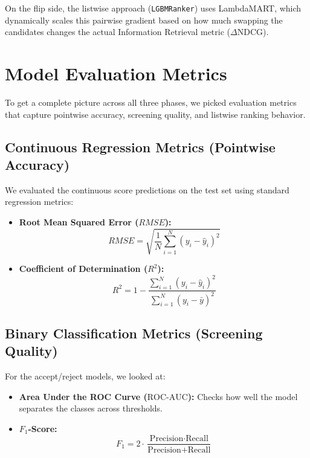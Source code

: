 \documentclass[12pt,a4paper,oneside]{report}
\begin{document}
On the flip side, the listwise approach (\texttt{LGBMRanker}) uses LambdaMART, which dynamically scales this pairwise gradient based on how much swapping the candidates changes the actual Information Retrieval metric ($\Delta \text{NDCG}$).

\section{Model Evaluation Metrics}

To get a complete picture across all three phases, we picked evaluation metrics that capture pointwise accuracy, screening quality, and listwise ranking behavior.

\subsection{Continuous Regression Metrics (Pointwise Accuracy)}
We evaluated the continuous score predictions on the test set using standard regression metrics:
\begin{itemize}
    \item \textbf{Root Mean Squared Error ($RMSE$):}
    \begin{equation}
    RMSE = \sqrt{\frac{1}{N}\sum_{i=1}^{N} (y_i - \hat{y}_i)^2}
    \end{equation}
    
    \item \textbf{Coefficient of Determination ($R^2$):}
    \begin{equation}
    R^2 = 1 - \frac{\sum_{i=1}^{N} (y_i - \hat{y}_i)^2}{\sum_{i=1}^{N} (y_i - \bar{y})^2}
    \end{equation}
\end{itemize}

\subsection{Binary Classification Metrics (Screening Quality)}
For the accept/reject models, we looked at:
\begin{itemize}
    \item \textbf{Area Under the ROC Curve ($\text{ROC-AUC}$):} Checks how well the model separates the classes across thresholds.
    
    \item \textbf{$F_1$-Score:}
    \begin{equation}
    F_1 = 2 \cdot \frac{\text{Precision} \cdot \text{Recall}}{\text{Precision} + \text{Recall}}
    \end{equation}
\end{itemize}
\end{document}
